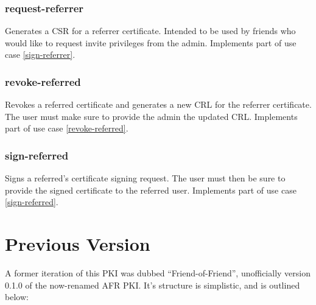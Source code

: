 \documentclass{article}
\begin{document}
\subsubsection{request-referrer}

Generates a CSR for a referrer certificate.  Intended to be used by friends who would like to request invite privileges from the admin.  Implements part of use case \ref{sign-referrer}.

\subsubsection{revoke-referred}

Revokes a referred certificate and generates a new CRL for the referrer certificate.  The user must make sure to provide the admin the updated CRL.  Implements part of use case \ref{revoke-referred}.

\subsubsection{sign-referred}

Signs a referred's certificate signing request.  The user must then be sure to provide the signed certificate to the referred user.  Implements part of use case \ref{sign-referred}.

\section{Previous Version}
A former iteration of this PKI was dubbed ``Friend-of-Friend'', unofficially version 0.1.0 of the now-renamed AFR PKI.  It's structure is simplistic, and is outlined below:

\begin{center}
\end{center}
\end{document}
